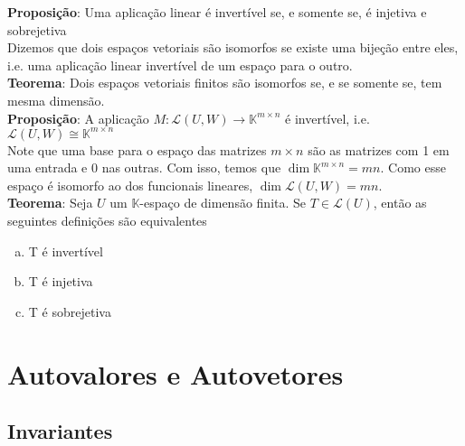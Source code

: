 \documentclass{article}
\newcommand{\K}{\mathbb{K}}
\begin{document}
\textbf{Proposição}: Uma aplicação linear é invertível se, e somente se, é injetiva e sobrejetiva \vspace{3mm} \\
Dizemos que dois espaços vetoriais são isomorfos se existe uma bijeção entre eles, i.e. uma aplicação linear invertível de um espaço para o outro. \vspace{3mm} \\
\textbf{Teorema}: Dois espaços vetoriais finitos são isomorfos se, e se somente se, tem mesma dimensão. \vspace{3mm} \\
\textbf{Proposição}: A aplicação $M: \mathcal{L}(U,W) \to \K^{m \times n}$ é invertível, i.e. \linebreak $\mathcal{L}(U,W) \cong \K^{m \times n}$ \vspace{3mm} \\
Note que uma base para o espaço das matrizes $m \times n$ são as matrizes com 1 em uma entrada e 0 nas outras. Com isso, temos que $\dim \K^{m \times n} = mn$. Como esse espaço é isomorfo ao dos funcionais lineares, $\dim \mathcal{L}(U,W) = mn$. \vspace{3mm} \\
\textbf{Teorema}: Seja $U$ um $\K$-espaço de dimensão finita. Se $T \in \mathcal{L}(U)$, então as seguintes definições são equivalentes
\begin{enumerate}[(a)]
    \item T é invertível
    \item T é injetiva
    \item T é sobrejetiva
\end{enumerate}

\newpage

\section{Autovalores e Autovetores}

\subsection{Invariantes}
\end{document}
